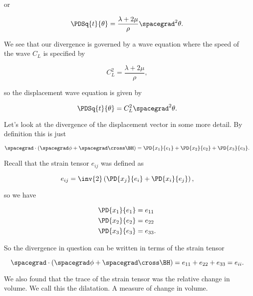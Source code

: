 or

\begin{equation}\label{eqn:continuumL7:50}
\PDSq{t}{\theta} = \frac{\lambda + 2 \mu}{\rho} \spacegrad^2 \theta.
\end{equation}

We see that our divergence is governed by a wave equation where the speed of the wave $C_L$ is specified by

\begin{equation}\label{eqn:continuumL7:70}
C_L^2 = \frac{\lambda + 2 \mu}{\rho},
\end{equation}

so the displacement wave equation is given by

\begin{equation}\label{eqn:continuumL7:90}
\PDSq{t}{\theta} = C_L^2 \spacegrad^2 \theta.
\end{equation}

Let's look at the divergence of the displacement vector in some more detail.  By definition this is just

\begin{equation}\label{eqn:continuumL7:110}
\spacegrad \cdot (\spacegrad \phi + \spacegrad \cross \BH) = 
\PD{x_1}{e_1}
+\PD{x_2}{e_2}
+\PD{x_3}{e_3}.
\end{equation}

Recall that the strain tensor $e_{ij}$ was defined as

\begin{equation}\label{eqn:continuumL7:130}
e_{ij} = \inv{2} \left( 
\PD{x_j}{e_i}
+
\PD{x_i}{e_j}
\right),
\end{equation}

so we have

\begin{align}\label{eqn:continuumL7:150}
\PD{x_1}{e_1} &= e_{11} \\
\PD{x_2}{e_2} &= e_{22} \\
\PD{x_3}{e_3} &= e_{33}.
\end{align}

So the divergence in question can be written in terms of the strain tensor

\begin{equation}\label{eqn:continuumL7:170}
\spacegrad \cdot (\spacegrad \phi + \spacegrad \cross \BH) = 
e_{11}
+e_{22}
+e_{33} = e_{ii}.
\end{equation}

We also found that the trace of the strain tensor was the relative change in volume.  We call this the dilatation.  A measure of change in volume.

